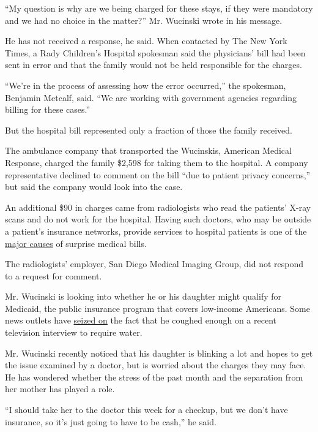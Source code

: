 ``My question is why are we being charged for these stays, if they were
mandatory and we had no choice in the matter?'' Mr. Wucinski wrote in
his message.

He has not received a response, he said. When contacted by The New York
Times, a Rady Children's Hospital spokesman said the physicians' bill
had been sent in error and that the family would not be held responsible
for the charges.

``We're in the process of assessing how the error occurred,'' the
spokesman, Benjamin Metcalf, said. ``We are working with government
agencies regarding billing for these cases.''

But the hospital bill represented only a fraction of those the family
received.

The ambulance company that transported the Wucinskis, American Medical
Response, charged the family \$2,598 for taking them to the hospital. A
company representative declined to comment on the bill ``due to patient
privacy concerns,'' but said the company would look into the case.

An additional \$90 in charges came from radiologists who read the
patients' X-ray scans and do not work for the hospital. Having such
doctors, who may be outside a patient's insurance networks, provide
services to hospital patients is one of the
\href{https://www.nytimes.com/2014/09/21/us/drive-by-doctoring-surprise-medical-bills.html}{major
causes} of surprise medical bills.

The radiologists' employer, San Diego Medical Imaging Group, did not
respond to a request for comment.

Mr. Wucinski is looking into whether he or his daughter might qualify
for Medicaid, the public insurance program that covers low-income
Americans. Some news outlets have
\href{https://nypost.com/2020/02/28/man-cleared-after-coronavirus-quarantine-cant-stop-coughing-in-tv-interview/}{seized
on} the fact that he coughed enough on a recent television interview to
require water.

Mr. Wucinski recently noticed that his daughter is blinking a lot and
hopes to get the issue examined by a doctor, but is worried about the
charges they may face. He has wondered whether the stress of the past
month and the separation from her mother has played a role.

``I should take her to the doctor this week for a checkup, but we don't
have insurance, so it's just going to have to be cash,'' he said.

